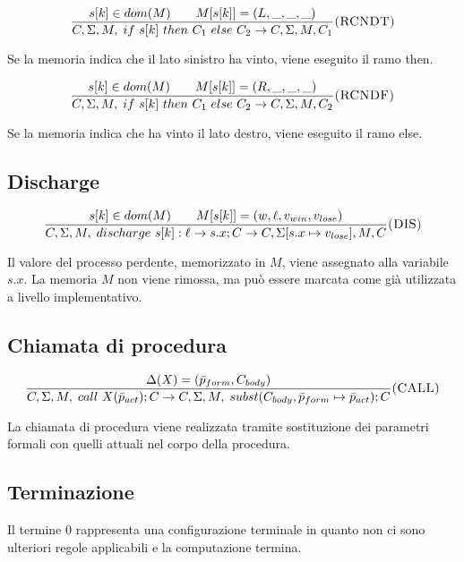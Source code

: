 \[
\frac{
s[k] \in dom(M)
\qquad
M[s[k]] = (L,\_,\_,\_)
}{
C,\Sigma,M,\; if\ s[k]\ then\ C_1\ else\ C_2
\rightarrow
C,\Sigma,M,C_1
}
\rulelabel{RCNDT}
\]

Se la memoria indica che il lato sinistro ha vinto, viene eseguito il ramo then.

\[
\frac{
s[k] \in dom(M)
\qquad
M[s[k]] = (R,\_,\_,\_)
}{
C,\Sigma,M,\; if\ s[k]\ then\ C_1\ else\ C_2
\rightarrow
C,\Sigma,M,C_2
}
\rulelabel{RCNDF}
\]

Se la memoria indica che ha vinto il lato destro, viene eseguito il ramo else.

\subsection*{Discharge}

\[
\frac{
s[k] \in dom(M)
\qquad
M[s[k]] = (w,\ell,v_{win},v_{lose})
}{
C,\Sigma,M,\; discharge\ s[k] : \ell \rightarrow s.x ; C
\rightarrow
C,\Sigma[s.x \mapsto v_{lose}],M,C
}
\rulelabel{DIS}
\]

Il valore del processo perdente, memorizzato in \(M\), viene assegnato alla variabile \(s.x\). La memoria \(M\) non viene rimossa, ma può essere marcata come già utilizzata a livello implementativo.

\subsection*{Chiamata di procedura}

\[
\frac{
\Delta(X) = (\bar{p}_{form}, C_{body})
}{
C,\Sigma,M,\; call\ X(\bar{p}_{act}) ; C
\rightarrow
C,\Sigma,M,\; subst(C_{body},\bar{p}_{form} \mapsto \bar{p}_{act}) ; C
}
\rulelabel{CALL}
\]

La chiamata di procedura viene realizzata tramite sostituzione dei parametri formali con quelli attuali nel corpo della procedura.

\subsection*{Terminazione}

Il termine \(0\) rappresenta una configurazione terminale in quanto non ci sono ulteriori regole applicabili e la computazione termina.
